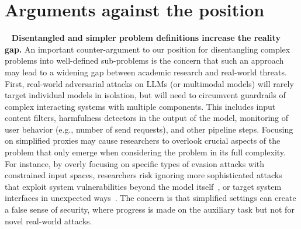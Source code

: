 



\vspace{-7pt}
\section{Arguments against the position}~\label{sec:arguments_against}
\textbf{Disentangled and simpler problem definitions increase the reality gap.} An important counter-argument to our position for disentangling complex problems into well-defined sub-problems is the concern that such an approach may lead to a widening gap between academic research and real-world threats. First, real-world adversarial attacks on LLMs (or multimodal models) will rarely target individual models in isolation, but will need to circumvent guardrails of complex interacting systems with multiple components. This includes input content filters, harmfulness detectors in the output of the model, monitoring of user behavior (e.g., number of send requests), and other pipeline steps. Focusing on simplified proxies may cause researchers to overlook crucial aspects of the problem that only emerge when considering the problem in its full complexity. For instance, by overly focusing on specific types of evasion attacks with constrained input spaces, researchers risk ignoring more sophisticated attacks that exploit system vulnerabilities beyond the model itself~\cite{debenedetti2024privacy}, or target system interfaces in unexpected ways~\cite{carlini2024stealing}. The concern is that simplified settings can create a false sense of security, where progress is made on the auxiliary task but not for novel real-world attacks.  

